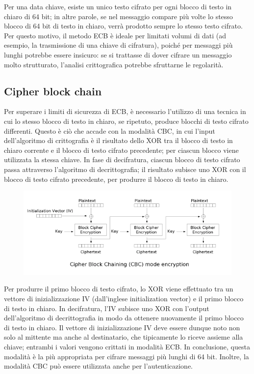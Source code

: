 \documentclass[10pt,a4paper]{article}
\begin{document}
Per una data chiave, esiste un unico testo cifrato per ogni blocco di testo in chiaro di 64 bit; in altre parole, se nel messaggio compare più volte lo stesso blocco di 64 bit di testo in chiaro, verrà prodotto sempre lo stesso testo cifrato. Per questo motivo, il metodo ECB è ideale per limitati volumi di dati (ad esempio, la trasmissione di una chiave di cifratura), poiché per messaggi più lunghi potrebbe essere insicuro: se si trattasse di dover cifrare un messaggio molto strutturato, l'analisi crittografica potrebbe sfruttarne le regolarità.

\subsection{Cipher block chain}
Per superare i limiti di sicurezza di ECB, è necessario l'utilizzo di una tecnica in cui lo stesso blocco di testo in chiaro, se ripetuto, produce blocchi di testo cifrato differenti. Questo è ciò che accade con la modalità CBC, in cui l'input dell'algoritmo di crittografia è il risultato dello XOR tra il blocco di testo in chiaro corrente e il blocco di testo cifrato precedente; per ciascun blocco viene utilizzata la stessa chiave.
In fase di decifratura, ciascun blocco di testo cifrato passa attraverso l'algoritmo di decrittografia; il risultato subisce uno XOR con il blocco di testo cifrato precedente, per produrre il blocco di testo in chiaro.

\begin{figure}[htbp]
\includegraphics[scale=0.8]{immagini/cbc.png}
\end{figure}

Per produrre il primo blocco di testo cifrato, lo XOR viene effettuato tra un vettore di inizializzazione IV (dall'inglese initialization vector) e il primo blocco di testo in chiaro. In decifratura, l'IV subisce uno XOR con l'output dell'algoritmo di decrittografia in modo da ottenere nuovamente il primo blocco di testo in chiaro.
Il vettore di inizializzazione IV deve essere dunque noto non solo al mittente ma anche al destinatario, che tipicamente lo riceve assieme alla chiave; entrambi i valori vengono crittati in modalità ECB.
In conclusione, questa modalità è la più appropriata per cifrare messaggi più lunghi di 64 bit. Inoltre, la modalità CBC può essere utilizzata anche per l'autenticazione.
\end{document}
